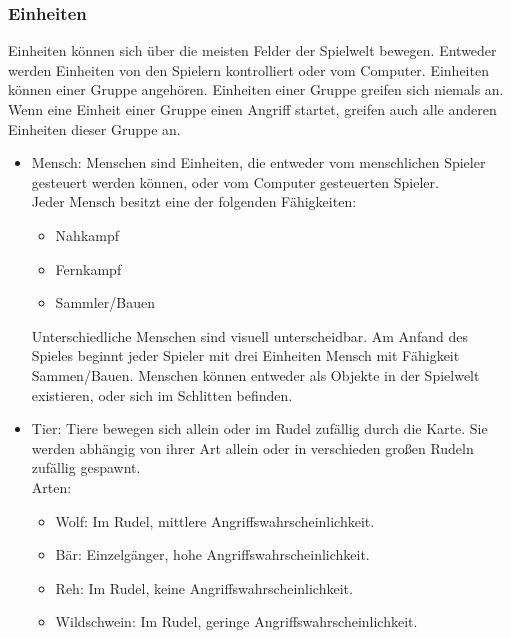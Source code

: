 \documentclass[a4paper,
  twoside, %
  headlines=2.1 %
  ]{scrartcl}
\begin{document}
		\subsubsection {Einheiten}
		Einheiten können sich über die meisten Felder der Spielwelt bewegen. Entweder werden Einheiten von den Spielern kontrolliert oder vom Computer.  Einheiten können einer Gruppe angehören. Einheiten einer Gruppe greifen sich niemals an. Wenn eine Einheit einer Gruppe einen Angriff startet, greifen auch alle anderen Einheiten dieser Gruppe an.
		\begin{itemize}
		    \item Mensch:
				Menschen sind Einheiten, die entweder vom menschlichen Spieler gesteuert werden können, 				oder vom Computer gesteuerten Spieler. 	
				\\Jeder Mensch besitzt eine der folgenden Fähigkeiten:
					\begin{itemize}
					\item Nahkampf
					\item Fernkampf
					\item Sammler/Bauen
					\end{itemize}
				Unterschiedliche Menschen sind visuell unterscheidbar. 
				Am Anfand des Spieles beginnt jeder Spieler mit drei Einheiten Mensch mit Fähigkeit 						Sammen/Bauen.
				Menschen können entweder als Objekte in der Spielwelt existieren, oder sich im 							Schlitten befinden.
			\item Tier: 
				Tiere bewegen sich allein oder im Rudel zufällig durch die Karte. 
				Sie werden abhängig von ihrer Art allein oder in verschieden großen Rudeln zufällig gespawnt. \\
				Arten:
				\begin{itemize}
					\item Wolf: Im Rudel, mittlere Angriffswahrscheinlichkeit.
					\item Bär: Einzelgänger, hohe Angriffswahrscheinlichkeit.
					\item Reh: Im Rudel, keine Angriffswahrscheinlichkeit.
					\item Wildschwein: Im Rudel, geringe Angriffswahrscheinlichkeit.
				\end{itemize}
			
		\end{itemize}
\end{document}
